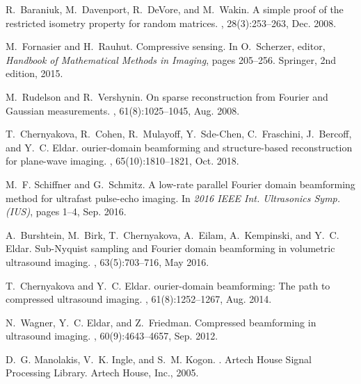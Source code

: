 \documentclass[10pt,twocolumn,romanappendices,final]{IEEEtran}
\begin{document}
\begin{thebibliography}{100}
R.~Baraniuk, M.~Davenport, R.~DeVore, and M.~Wakin.
\newblock A simple proof of the restricted isometry property for random
  matrices.
, 28(3):253--263, Dec. 2008.

M.~Fornasier and H.~Rauhut.
\newblock Compressive sensing.
\newblock In O.~Scherzer, editor, {\em Handbook of Mathematical Methods in
  Imaging}, pages 205--256. Springer, 2nd edition, 2015.

M.~Rudelson and R.~Vershynin.
\newblock On sparse reconstruction from {F}ourier and {G}aussian measurements.
, 61(8):1025--1045, Aug. 2008.

T.~Chernyakova, R.~Cohen, R.~Mulayoff, Y.~Sde-Chen, C.~Fraschini, J.~Bercoff,
  and Y.~C. Eldar.
ourier-domain beamforming and structure-based reconstruction for
  plane-wave imaging.
,
  65(10):1810--1821, Oct. 2018.

M.~F. Schiffner and G.~Schmitz.
\newblock A low-rate parallel {F}ourier domain beamforming method for ultrafast
  pulse-echo imaging.
\newblock In {\em 2016 IEEE Int. Ultrasonics Symp. (IUS)}, pages 1--4, Sep.
  2016.

A.~Burshtein, M.~Birk, T.~Chernyakova, A.~Eilam, A.~Kempinski, and Y.~C. Eldar.
\newblock Sub-{N}yquist sampling and {F}ourier domain beamforming in volumetric
  ultrasound imaging.
,
  63(5):703--716, May 2016.

T.~Chernyakova and Y.~C. Eldar.
ourier-domain beamforming: {T}he path to compressed ultrasound
  imaging.
,
  61(8):1252--1267, Aug. 2014.

N.~Wagner, Y.~C. Eldar, and Z.~Friedman.
\newblock Compressed beamforming in ultrasound imaging.
, 60(9):4643--4657, Sep. 2012.

D.~G. Manolakis, V.~K. Ingle, and S.~M. Kogon.
.
\newblock Artech House Signal Processing Library. Artech House, Inc., 2005.


\end{thebibliography}
\end{document}
